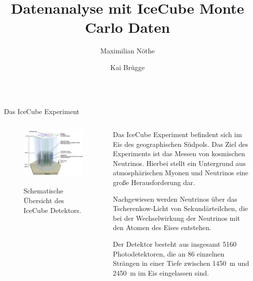 \documentclass[t]{beamer}
\title{Datenanalyse mit IceCube Monte Carlo Daten}
\author{Maximilian Nöthe \and Kai Brügge}
\institute{%
  \texttt{[image: tudo.pdf]}%
}
\begin{document}
  \begin{columns}[onlytextwidth]%
    \begin{column}{0.5\textwidth}%
      \begin{block}[equal height group=A]{Das IceCube Experiment}%
        \begin{columns}[onlytextwidth]%
          \begin{column}{0.48\textwidth}%
            \begin{figure}
              \includegraphics[width=\linewidth]{images/icecube_schema.jpg}\\
              \caption{Schematische Übersicht des IceCube Detektors.}
            \end{figure}
          \end{column}\hfill
          \begin{column}{0.48\textwidth}%
            \justifying
            Das IceCube Experiment befindent sich im Eis des geographischen Südpols.
            Das Ziel des Experiments ist das Messen von kosmischen Neutrinos.
            Hierbei stellt ein Untergrund aus atmosphärischen Myonen und Neutrinos eine
            große Herausforderung dar.

            Nachgewiesen werden Neutrinos über das Tscherenkow-Licht von Sekundärteilchen,
            die bei der Wechselwirkung der Neutrinos mit den Atomen des Eises entstehen.

            Der Detektor besteht aus insgesamt \num{5160} Photodetektoren,
            die an \num{86} einzelnen Strängen in einer Tiefe zwischen
            \SI{1450}{\meter} und \SI{2450}{\meter} im Eis eingelassen sind.


\end{column}
\end{columns}
\end{block}
\end{column}
\end{columns}
\end{document}
